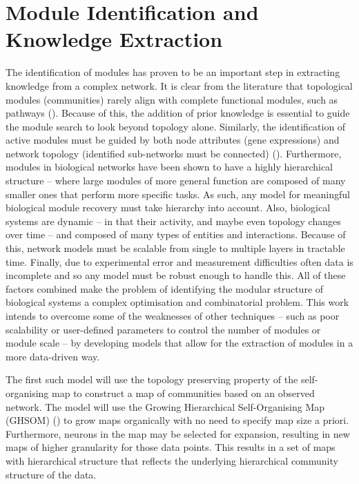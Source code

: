 \documentclass[
11pt, %
english, %
singlespacing, %
headsepline, %
]{MastersDoctoralThesis} %
\begin{document}
\section{Module Identification and Knowledge Extraction}
The identification of modules has proven to be an important step in extracting knowledge from a complex network. It is clear from the literature that topological modules (communities) rarely align with complete functional modules, such as pathways (\cite{he2016cooperative}). Because of this, the addition of prior knowledge is essential to guide the module search to look beyond topology alone. Similarly, the identification of active modules must be guided by both node attributes (gene expressions) and network topology (identified sub-networks must be connected) (\cite{ideker2002discovering}). Furthermore, modules in biological networks have been shown to have a highly hierarchical structure -- where large modules of more general function are composed of many smaller ones that perform more specific tasks. As such, any model for meaningful biological module recovery must take hierarchy into account. Also, biological systems are dynamic -- in that their activity, and maybe even topology changes over time -- and composed of many types of entities and interactions. Because of this, network models must be scalable from single to multiple layers in tractable time. Finally, due to experimental error and measurement difficulties often data is incomplete and so any model must be robust enough to handle this. All of these factors combined make the problem of identifying the modular structure of biological systems a complex optimisation and combinatorial problem. This work intends to overcome some of the weaknesses of other techniques -- such as poor scalability or user-defined parameters to control the number of modules or module scale -- by developing models that allow for the extraction of modules in a more data-driven way.

The first such model will use the topology preserving property of the self-organising map to construct a map of communities based on an observed network. The model will use the Growing Hierarchical Self-Organising Map (GHSOM) (\cite{dittenbach2000growing}) to grow maps organically with no need to specify map size a priori. Furthermore, neurons in the map may be selected for expansion, resulting in new maps of higher granularity for those data points. This results in a set of maps with hierarchical structure that reflects the underlying hierarchical community structure of the data.
\end{document}
